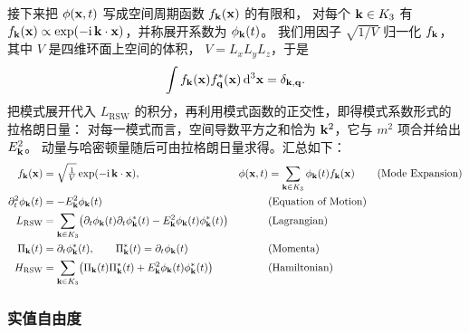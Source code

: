 接下来把 $\phi(\mathbf{x},t)$ 写成空间周期函数 $f_{\mathbf{k}}(\mathbf{x})$ 的有限和，
对每个 $\mathbf{k}\in K_{3}$ 有 $f_{\mathbf{k}}(\mathbf{x})\propto\exp(-\mathrm{i}\,\mathbf{k}\cdot\mathbf{x})$，并称展开系数为 $\phi_{\mathbf{k}}(t)$。
我们用因子 $\sqrt{1/V}$ 归一化 $f_{\mathbf{k}}$，其中 $V$ 是四维环面上空间的体积，
$V=L_{x}L_{y}L_{z}$，于是
\begin{equation*}
\int f_{\mathbf{k}}(\mathbf{x})f_{\mathbf{q}}^{*}(\mathbf{x})\,\mathrm{d}^{3}\mathbf{x}=\delta_{\mathbf{k},\mathbf{q}}.
\end{equation*}
把模式展开代入 $L_{\text{RSW}}$ 的积分，再利用模式函数的正交性，即得模式系数形式的拉格朗日量：
对每一模式而言，空间导数平方之和恰为 $\mathbf{k}^{2}$，它与 $m^{2}$ 项合并给出 $E_{\mathbf{k}}^{2}$。
动量与哈密顿量随后可由拉格朗日量求得。汇总如下：
\begin{align}
f_{\mathbf{k}}(\mathbf{x})&=\sqrt{\tfrac{1}{V}}\exp(-\mathrm{i}\,\mathbf{k}\cdot\mathbf{x}),&
\phi(\mathbf{x},t)&=\sum_{\mathbf{k}\in K_{3}}\phi_{\mathbf{k}}(t)f_{\mathbf{k}}(\mathbf{x})
&&\text{(Mode Expansion)}\\
\partial_{t}^{2}\phi_{\mathbf{k}}(t)&=-E_{\mathbf{k}}^{2}\phi_{\mathbf{k}}(t)
&&\text{(Equation of Motion)}\\
L_{\text{RSW}}&=\sum_{\mathbf{k}\in K_{3}}\bigl(\partial_{t}\phi_{\mathbf{k}}(t)\partial_{t}\phi^{*}_{\mathbf{k}}(t)
-E_{\mathbf{k}}^{2}\phi_{\mathbf{k}}(t)\phi^{*}_{\mathbf{k}}(t)\bigr)
&&\text{(Lagrangian)}\\
\Pi_{\mathbf{k}}(t)&=\partial_{t}\phi^{*}_{\mathbf{k}}(t),\qquad
\Pi^{*}_{\mathbf{k}}(t)=\partial_{t}\phi_{\mathbf{k}}(t)
&&\text{(Momenta)}\\
H_{\text{RSW}}&=\sum_{\mathbf{k}\in K_{3}}\bigl(\Pi_{\mathbf{k}}(t)\Pi^{*}_{\mathbf{k}}(t)
+E_{\mathbf{k}}^{2}\phi_{\mathbf{k}}(t)\phi^{*}_{\mathbf{k}}(t)\bigr)
&&\text{(Hamiltonian)}
\end{align}

\subsubsection*{实值自由度}

